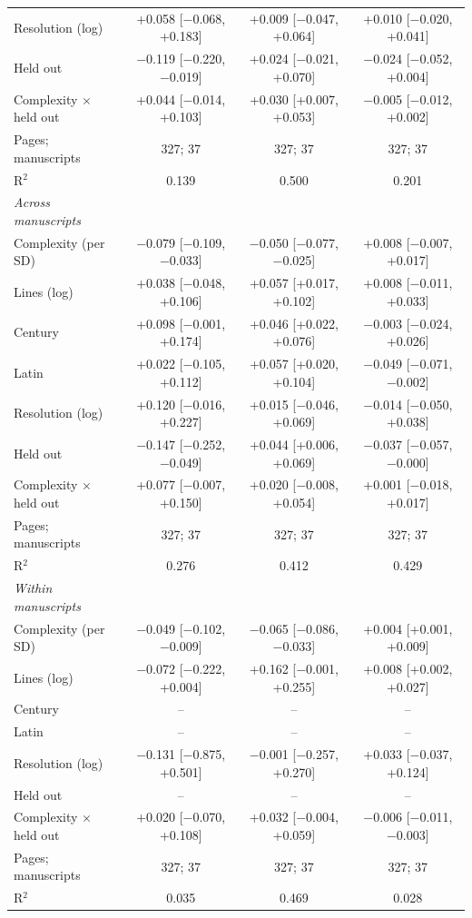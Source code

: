 \begin{table}[htbp]
\begin{tabular}{lccc}
    Resolution (log) & +0.058 [$-$0.068, +0.183] & +0.009 [$-$0.047, +0.064] & +0.010 [$-$0.020, +0.041] \\
    Held out & $-$0.119 [$-$0.220, $-$0.019] & +0.024 [$-$0.021, +0.070] & $-$0.024 [$-$0.052, +0.004] \\
    Complexity $\times$ held out & +0.044 [$-$0.014, +0.103] & +0.030 [+0.007, +0.053] & $-$0.005 [$-$0.012, +0.002] \\
    Pages; manuscripts & 327; 37 & 327; 37 & 327; 37 \\
    R$^2$ & 0.139 & 0.500 & 0.201 \\
    \midrule
    \textit{Across manuscripts} &  &  &  \\
    Complexity (per SD) & $-$0.079 [$-$0.109, $-$0.033] & $-$0.050 [$-$0.077, $-$0.025] & +0.008 [$-$0.007, +0.017] \\
    Lines (log) & +0.038 [$-$0.048, +0.106] & +0.057 [+0.017, +0.102] & +0.008 [$-$0.011, +0.033] \\
    Century & +0.098 [$-$0.001, +0.174] & +0.046 [+0.022, +0.076] & $-$0.003 [$-$0.024, +0.026] \\
    Latin & +0.022 [$-$0.105, +0.112] & +0.057 [+0.020, +0.104] & $-$0.049 [$-$0.071, $-$0.002] \\
    Resolution (log) & +0.120 [$-$0.016, +0.227] & +0.015 [$-$0.046, +0.069] & $-$0.014 [$-$0.050, +0.038] \\
    Held out & $-$0.147 [$-$0.252, $-$0.049] & +0.044 [+0.006, +0.069] & $-$0.037 [$-$0.057, $-$0.000] \\
    Complexity $\times$ held out & +0.077 [$-$0.007, +0.150] & +0.020 [$-$0.008, +0.054] & +0.001 [$-$0.018, +0.017] \\
    Pages; manuscripts & 327; 37 & 327; 37 & 327; 37 \\
    R$^2$ & 0.276 & 0.412 & 0.429 \\
    \midrule
    \textit{Within manuscripts} &  &  &  \\
    Complexity (per SD) & $-$0.049 [$-$0.102, $-$0.009] & $-$0.065 [$-$0.086, $-$0.033] & +0.004 [+0.001, +0.009] \\
    Lines (log) & $-$0.072 [$-$0.222, +0.004] & +0.162 [$-$0.001, +0.255] & +0.008 [+0.002, +0.027] \\
    Century & -- & -- & -- \\
    Latin & -- & -- & -- \\
    Resolution (log) & $-$0.131 [$-$0.875, +0.501] & $-$0.001 [$-$0.257, +0.270] & +0.033 [$-$0.037, +0.124] \\
    Held out & -- & -- & -- \\
    Complexity $\times$ held out & +0.020 [$-$0.070, +0.108] & +0.032 [$-$0.004, +0.059] & $-$0.006 [$-$0.011, $-$0.003] \\
    Pages; manuscripts & 327; 37 & 327; 37 & 327; 37 \\
    R$^2$ & 0.035 & 0.469 & 0.028 \\
    \bottomrule
  \end{tabular}
\end{table}
